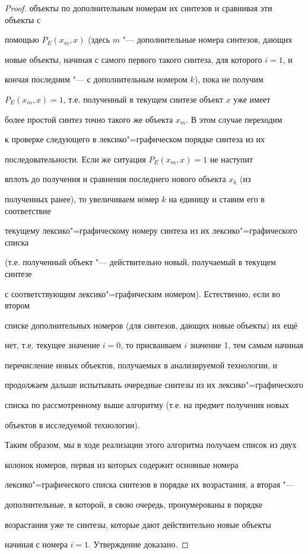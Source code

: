 \begin{proof}
объекты по дополнительным номерам их синтезов и сравнивая эти объекты с

помощью $P_{E}(x_{m}, x)$ (здесь $m$ "--- дополнительные номера синтезов, дающих

новые объекты, начиная с самого первого такого синтеза, для которого $i = 1$, и

кончая последним "--- с дополнительным номером $k$), пока не получим

$P_{E}(x_{m}, x) =1$, т.е. полученный в текущем синтезе объект $x$ уже имеет

более простой синтез точно такого же объекта $x_{m}$. В этом случае переходим

к проверке следующего в лексико"=графическом порядке синтеза из их

последовательности. Если же ситуация $P_{E}(x_{m}, x) = 1$ не наступит

вплоть до получения и сравнения последнего нового объекта $x_{k}$ (из

полученных ранее), то увеличиваем номер $k$ на единицу и ставим его в соответствие

текущему лексико"=графическому номеру синтеза из их лексико"=графического списка

(т.е. полученный объект "--- действительно новый, получаемый в текущем синтезе

с соответствующим лексико"=графическим номером). Естественно, если во втором

списке дополнительных номеров (для синтезов, дающих новые объекты) их ещё

нет, т.е. текущее значение $ i = 0$, то присваиваем $i$ значение 1, тем самым начиная

перечисление новых объектов, получаемых в анализируемой технологии, и

продолжаем дальше испытывать очередные синтезы из их лексико"=графического

списка по рассмотренному выше алгоритму (т.е. на предмет получения новых

объектов в исследуемой технологии).



Таким образом, мы в ходе реализации этого алгоритма получаем список из двух

колонок номеров, первая из которых содержит основные номера

лексико"=графического списка синтезов   в порядке их возрастания, а вторая "---

дополнительные, в которой, в свою очередь, пронумерованы в порядке

возрастания уже те синтезы, которые дают действительно новые объекты

начиная с номера $i = 1$. Утверждение доказано.

\end{proof}




